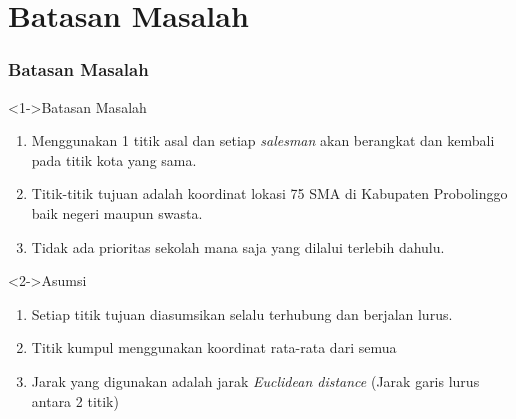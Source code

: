 \section{Batasan Masalah}
\begin{frame}
\frametitle{Batasan Masalah}

\begin{block}<1->{Batasan Masalah}
\begin{enumerate}
\item Menggunakan 1 titik asal dan setiap \textit{salesman} akan berangkat dan kembali pada titik kota yang sama.
\item Titik-titik tujuan adalah koordinat lokasi 75 SMA di Kabupaten Probolinggo baik negeri maupun swasta.
\item Tidak ada prioritas sekolah mana saja yang dilalui terlebih dahulu.
\end{enumerate}
\end{block}
\begin{block}<2->{Asumsi}
\begin{enumerate}
\item Setiap titik tujuan diasumsikan selalu terhubung dan berjalan lurus.
\item Titik kumpul menggunakan koordinat rata-rata dari semua
\item Jarak yang digunakan adalah jarak \textit{Euclidean distance} (Jarak garis lurus antara 2 titik)
\end{enumerate}
\end{block}
\end{frame}